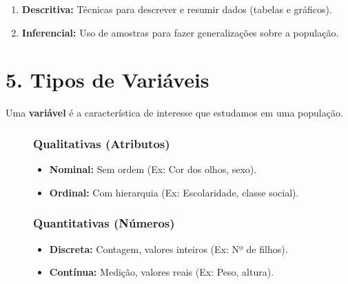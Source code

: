 \documentclass[
  letterpaper,
  DIV=11,
  numbers=noendperiod]{scrreprt}
\providecommand{\tightlist}{%
  \setlength{\itemsep}{0pt}\setlength{\parskip}{0pt}}\usepackage{longtable,booktabs,array}
\begin{document}
\begin{enumerate}
\def\labelenumi{\arabic{enumi}.}
\tightlist
\item
  \textbf{Descritiva:} Técnicas para descrever e resumir dados (tabelas
  e gráficos).
\item
  \textbf{Inferencial:} Uso de amostras para fazer generalizações sobre
  a população.
\end{enumerate}

\section{5. Tipos de Variáveis}\label{tipos-de-variuxe1veis}

Uma \textbf{variável} é a característica de interesse que estudamos em
uma população.

\begin{figure}

\begin{minipage}{0.50\linewidth}

\subsubsection{Qualitativas (Atributos)}\label{qualitativas-atributos}

\begin{itemize}
\tightlist
\item
  \textbf{Nominal:} Sem ordem (Ex: Cor dos olhos, sexo).
\item
  \textbf{Ordinal:} Com hierarquia (Ex: Escolaridade, classe social).
\end{itemize}

\end{minipage}%
%
\begin{minipage}{0.50\linewidth}

\subsubsection{Quantitativas (Números)}\label{quantitativas-nuxfameros}

\begin{itemize}
\tightlist
\item
  \textbf{Discreta:} Contagem, valores inteiros (Ex: Nº de filhos).
\item
  \textbf{Contínua:} Medição, valores reais (Ex: Peso, altura).
\end{itemize}

\end{minipage}%

\end{figure}%
\end{document}
